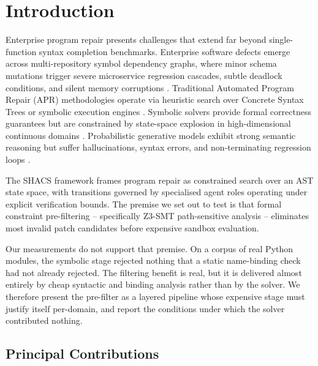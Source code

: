 \documentclass[10pt,twocolumn,letterpaper]{article}
\begin{document}
\section{Introduction}


Enterprise program repair presents challenges that extend far beyond single-function syntax completion benchmarks. Enterprise software defects emerge across multi-repository symbol dependency graphs, where minor schema mutations trigger severe microservice regression cascades, subtle deadlock conditions, and silent memory corruptions \cite{arxiv_2405_01543,arxiv_2203_02155}. Traditional Automated Program Repair (APR) methodologies operate via heuristic search over Concrete Syntax Trees or symbolic execution engines \cite{arxiv_2010_11146}. Symbolic solvers provide formal correctness guarantees but are constrained by state-space explosion in high-dimensional continuous domains \cite{arxiv_2404_01131}. Probabilistic generative models exhibit strong semantic reasoning but suffer hallucinations, syntax errors, and non-terminating regression loops \cite{arxiv_2005_14165}.

The SHACS framework frames program repair as constrained search over an AST state space, with transitions governed by specialised agent roles operating under explicit verification bounds. The premise we set out to test is that formal constraint pre-filtering -- specifically Z3-SMT path-sensitive analysis -- eliminates most invalid patch candidates before expensive sandbox evaluation.

Our measurements do not support that premise. On a corpus of real Python modules, the symbolic stage rejected nothing that a static name-binding check had not already rejected. The filtering benefit is real, but it is delivered almost entirely by cheap syntactic and binding analysis rather than by the solver. We therefore present the pre-filter as a layered pipeline whose expensive stage must justify itself per-domain, and report the conditions under which the solver contributed nothing.


\subsection{Principal Contributions}
\end{document}
